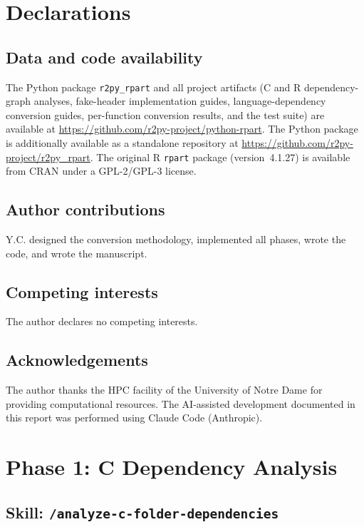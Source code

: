 \documentclass[12pt]{article}
\begin{document}
\section*{Declarations}

\subsection*{Data and code availability}

The Python package \texttt{r2py\_rpart} and all project artifacts (C and R dependency-graph analyses, fake-header implementation guides, language-dependency conversion guides, per-function conversion results, and the test suite) are available at \url{https://github.com/r2py-project/python-rpart}. The Python package is additionally available as a standalone repository at \url{https://github.com/r2py-project/r2py_rpart}. The original R \texttt{rpart} package (version~4.1.27) is available from CRAN under a GPL-2/GPL-3 license.

\subsection*{Author contributions}

Y.C. designed the conversion methodology, implemented all phases, wrote the code, and wrote the manuscript.

\subsection*{Competing interests}

The author declares no competing interests.

\subsection*{Acknowledgements}

The author thanks the HPC facility of the University of Notre Dame for providing computational resources. The AI-assisted development documented in this report was performed using Claude Code (Anthropic).

\appendix

\section{Phase 1: C Dependency Analysis}
\label{app:phase1}

\subsection{Skill: \texttt{/analyze-c-folder-dependencies}}
\label{app:skill:analyze-c-folder-dependencies}
\end{document}
